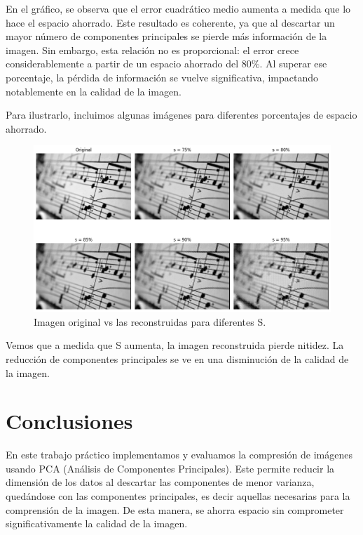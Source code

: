 \documentclass[a4paper,12pt]{article}
\begin{document}
En el gráfico, se observa que el error cuadrático medio aumenta a medida que lo hace el espacio ahorrado.
Este resultado es coherente, ya que al descartar un mayor número de componentes principales se pierde más 
información de la imagen. 
Sin embargo, esta relación no es proporcional: el error crece considerablemente a partir de un espacio 
ahorrado del 80\%. Al superar ese porcentaje, la pérdida de información se vuelve significativa, 
impactando notablemente en la calidad de la imagen. 


Para ilustrarlo, incluimos algunas imágenes para diferentes porcentajes de espacio ahorrado. 
\begin{figure}[H]
    \centering
    \includegraphics[width=1\textwidth]{Ejercicio 4b.png}
    \caption{Imagen original vs las reconstruidas para diferentes S.}
    \label{fig:ej4b}
\end{figure}

Vemos que a medida que S aumenta, la imagen reconstruida pierde nitidez. La reducción de 
componentes principales se ve en una disminución de la calidad de la imagen. 

\newpage
\section*{Conclusiones}
En este trabajo práctico implementamos y evaluamos la compresión de imágenes usando 
PCA (Análisis de Componentes Principales). Este permite reducir la dimensión de los datos
al descartar las componentes de menor varianza, quedándose con las componentes principales, 
es decir aquellas necesarias para la comprensión de la imagen. De esta manera, se ahorra espacio 
sin comprometer significativamente la calidad de la imagen.

\vspace{1em}
\end{document}
